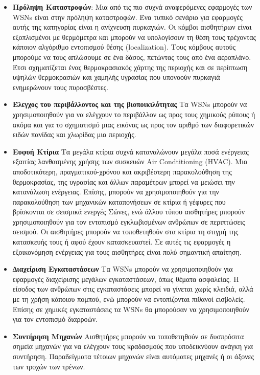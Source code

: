 \begin{itemize}
	\item \textbf{Πρόληψη Καταστροφών}: Μια από τις πιο συχνά αναφερόμενες εφαρμογές των WSNs είναι στην πρόληψη καταστροφών.
Ένα τυπικό σενάριο για εφαρμογές αυτής της κατηγορίας είναι η ανίχνευση πυρκαγιών.
Οι κόμβοι αισθητήρων είναι εξοπλισμένοι με θερμόμετρα και μπορούν να υπολογίσουν τη θέση τους τρέχοντας κάποιον αλγόριθμο εντοπισμού θέσης (localization).
Τους κόμβους αυτούς μπορούμε να τους απλώσουμε σε ένα δάσος, πετώντας τους από ένα αεροπλάνο. Έτσι σχηματίζεται ένας θερμοκρασιακός χάρτης της
περιοχής και σε περίπτωση υψηλών θερμοκρασιών και χαμηλής υγρασίας που υπονοούν πυρκαγιά ενημερώνουν τους πυροσβέστες.
	\item \textbf{Έλεγχος του περιβάλλοντος και της βιοποικιλότητας} Τα WSNs μπορούν να χρησιμοποιηθούν για να ελέγχουν το περιβάλλον ως προς τους χημικούς ρύπους
ή ακόμα και για το σχηματισμό μιας εικόνας ως προς τον αριθμό των διαφορετικών ειδών πανίδας και χλωρίδας μια περιοχής.
	\item \textbf{Ευφυή Κτίρια} Τα μεγάλα κτίρια συχνά καταναλώνουν μεγάλα ποσά ενέργειας εξαιτίας λανθασμένης χρήσης των συσκευών Air Condtitioning (HVAC).
Μια αποδοτικότερη, πραγματικού-χρόνου και ακριβέστερη παρακολούθηση της θερμοκρασίας, της υγρασίας και άλλων παραμέτρων μπορεί να μειώσει την κατανάλωση ενέργειας.
Επίσης, μπορούν να χρησιμοποιηθούν για την παρακολούθηση των μηχανικών καταπονήσεων σε κτίρια ή γέφυρες που βρίσκονται σε σεισμικά ενεργές Σώνες, ενώ άλλου τύπου
αισθητήρες μπορούν χρησιμοποιηθούν για τον εντοπισμό εγκλωβισμένων ανθρώπων σε περιπτώσεις σεισμού.
Οι αισθητήρες μπορούν να τοποθετηθούν στα κτίρια τη στιγμή της κατασκευής τους ή αφού έχουν κατασκευαστεί.
Σε αυτές τις εφαρμογές η εξοικονόμηση ενέργειας για τους αισθητήρες είναι πολύ σημαντική απαίτηση.
	\item \textbf{∆ιαχείριση Εγκαταστάσεων} Τα WSNs μπορούν να χρησιμοποιηθούν για εφαρμογές διαχείρισης μεγάλων εγκαταστάσεων, όπως θέματα ασφαλείας.
Η είσοδος των ανθρώπων στις εγκαταστάσεις μπορεί να γίνεται χωρίς κλειδιά, αλλά με τη χρήση κάποιου πομπού, ενώ μπορούν να εντοπίζονται πιθανοί εισβολείς.
Επίσης σε χημικές εγκαταστάσεις τα WSNs θα μπορούσαν να χρησιμοποιηθούν για τον εντοπισμό διαρροών.
	\item \textbf{Συντήρηση Μηχανών} Αισθητήρες μπορούν να τοποθετηθούν σε δυσπρόσιτα σημεία μηχανών για να ελέγχουν τους κραδασμούς που υποδεικνύουν ανάγκη για
συντήρηση.
Παραδείγματα τέτοιων μηχανών είναι αυτόματες μηχανές ή οι άξονες των τροχών των τρένων.

\end{itemize}

